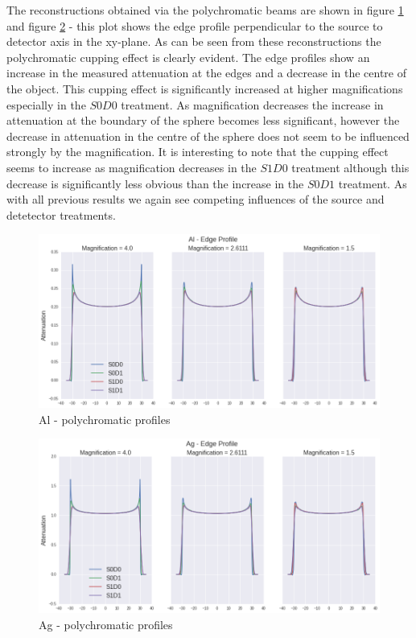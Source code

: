 \documentclass[
  twoside,
  11pt, a4paper,
  footinclude=true,
  headinclude=true,
  cleardoublepage=empty
]{scrbook}
\begin{document}
The reconstructions obtained via the polychromatic beams are shown in figure \ref{polyal} and figure \ref{polyag} - this plot shows the edge profile perpendicular to the source to detector axis in the xy-plane. As can be seen from these reconstructions the polychromatic cupping effect is clearly evident. The edge profiles show an increase in the measured attenuation at the edges and a decrease in the centre of the object. This cupping effect is significantly increased at higher magnifications especially in the $S0D0$ treatment. As magnification decreases the increase in attenuation at the boundary of the sphere becomes less significant, however the decrease in attenuation in the centre of the sphere does not seem to be influenced strongly by the magnification. It is interesting to note that the cupping effect seems to increase as magnification decreases in the $S1D0$ treatment although this decrease is significantly less obvious than the increase in the $S0D1$ treatment. As with all previous results we again see competing influences of the source and detetector treatments.

\begin{figure}[h!]
  \centering
    \includegraphics[width=\textwidth]{code/Polychromatic/Poly_Profiles_files/Poly_Profiles_3_1.png}
    \caption{Al - polychromatic profiles}
    \label{polyal}
\end{figure}

\begin{figure}[h!]
  \centering
    \includegraphics[width=\textwidth]{code/Polychromatic/Poly_Profiles_files/Poly_Profiles_4_1.png}
    \caption{Ag - polychromatic profiles}
    \label{polyag}
\end{figure}
\end{document}
